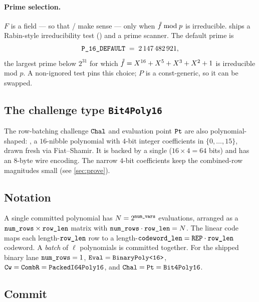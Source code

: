 \paragraph{Prime selection.}
$F$ is a field --- so that  /  make sense --- only
when $\tilde f \bmod p$ is irreducible.  ships a
Rabin-style irreducibility test ()
and a prime scanner. The default prime is
\[
  \texttt{P\_16\_DEFAULT} \;=\; 2\,147\,482\,921,
\]
the largest prime below $2^{31}$ for which
$\tilde f = X^{16}+X^5+X^3+X^2+1$ is irreducible mod $p$. A non-ignored
test pins this choice; $P$ is a const-generic, so it can be swapped.

\subsection{The challenge type {\tt Bit4Poly16}}
\label{sec:bit4poly}

The row-batching challenge $\texttt{Chal}$ and evaluation point
$\texttt{Pt}$ are also polynomial-shaped: , a
$16$-nibble polynomial with $4$-bit integer coefficients in
$\{0,\ldots,15\}$, drawn fresh via Fiat--Shamir. It is backed by a
single  ($16 \times 4 = 64$ bits) and has an $8$-byte wire
encoding. The narrow $4$-bit coefficients keep the combined-row
magnitudes small (see \autoref{sec:prove}).

\subsection{Notation}

A single committed polynomial has $N = 2^{\texttt{num\_vars}}$
evaluations, arranged as a $\texttt{num\_rows} \times \texttt{row\_len}$
matrix with $\texttt{num\_rows}\cdot\texttt{row\_len} = N$. The linear
code maps each length-$\texttt{row\_len}$ row to a length-$\texttt{codeword\_len}
= \texttt{REP}\cdot\texttt{row\_len}$ codeword. A \emph{batch} of $\ell$
polynomials is committed together. For the shipped binary lane
$\texttt{num\_rows} = 1$, $\texttt{Eval} = \texttt{BinaryPoly<16>}$,
$\texttt{Cw} = \texttt{CombR} = \texttt{PackedI64Poly16}$, and
$\texttt{Chal} = \texttt{Pt} = \texttt{Bit4Poly16}$.

\subsection{Commit}
\label{sec:commit}

